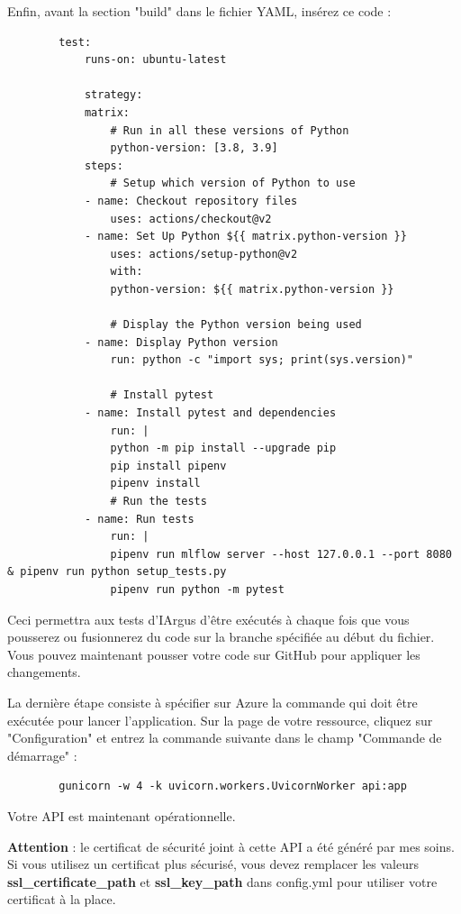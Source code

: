\documentclass[french]{article}
\begin{document}
    Enfin, avant la section "build" dans le fichier YAML, insérez ce code :
    \begin{verbatim}
        test:
            runs-on: ubuntu-latest
        
            strategy:
            matrix:
                # Run in all these versions of Python
                python-version: [3.8, 3.9]
            steps:
                # Setup which version of Python to use
            - name: Checkout repository files
                uses: actions/checkout@v2
            - name: Set Up Python ${{ matrix.python-version }}
                uses: actions/setup-python@v2
                with:
                python-version: ${{ matrix.python-version }}
        
                # Display the Python version being used
            - name: Display Python version
                run: python -c "import sys; print(sys.version)"
        
                # Install pytest
            - name: Install pytest and dependencies
                run: |
                python -m pip install --upgrade pip
                pip install pipenv
                pipenv install
                # Run the tests
            - name: Run tests
                run: |
                pipenv run mlflow server --host 127.0.0.1 --port 8080 & pipenv run python setup_tests.py
                pipenv run python -m pytest
    \end{verbatim}

    Ceci permettra aux tests d'IArgus d'être exécutés à chaque fois que vous pousserez ou fusionnerez du code sur la branche spécifiée au début du fichier. Vous pouvez maintenant pousser votre code sur GitHub pour appliquer les changements.

    La dernière étape consiste à spécifier sur Azure la commande qui doit être exécutée pour lancer l'application. Sur la page de votre ressource, cliquez sur "Configuration" et entrez la commande suivante dans le champ "Commande de démarrage" : 

    \begin{verbatim}
        gunicorn -w 4 -k uvicorn.workers.UvicornWorker api:app
    \end{verbatim} 
    
    Votre API est maintenant opérationnelle.
    
    \textbf{Attention} : le certificat de sécurité joint à cette API a été généré par mes soins. Si vous utilisez un certificat plus sécurisé, vous devez remplacer les valeurs \textbf{ssl\_certificate\_path} et \textbf{ssl\_key\_path} dans config.yml pour utiliser votre certificat à la place.
\end{document}
